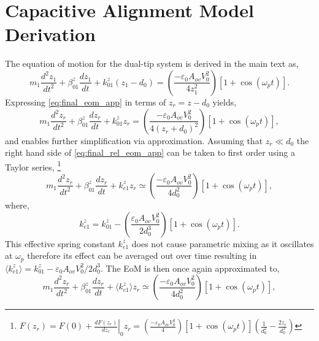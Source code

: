 \documentclass[12pt, a4paper, oneside]{book}
\begin{document}
\section{Capacitive Alignment Model Derivation}

The equation of motion for the dual-tip system is derived in the main text as,
\begin{equation}
	m_1 \frac{d^2z_1}{dt^2} + \beta_{01}^z \frac{dz_1}{dt} + k_{01}^z (z_1-d_0) = \left( \frac{-\varepsilon_0 A_{ov} V_0^2}{4z_1^2}\right)\left[1+\cos(\omega_pt)\right].
\label{eq:final_eom_app}
\end{equation}
Expressing \eqref{eq:final_eom_app} in terms of $z_r = z - d_0$ yields,
\begin{equation}
	m_1 \frac{d^2z_r}{dt^2} + \beta_{01}^z \frac{dz_r}{dt} + k_{01}^zz_r = \left( \frac{-\varepsilon_0 A_{ov} V_0^2}{4(z_r+d_0)^2}\right)\left[1+\cos(\omega_pt)\right],
\label{eq:final_rel_eom_app}
\end{equation}
and enables further simplification via approximation. Assuming that $z_r \ll d_0$ the right hand side of \eqref{eq:final_rel_eom_app} can be taken to first order using a Taylor series,%
\footnote{$F(z_r) = F(0) + \left.\frac{dF(z_r)}{dz_r}\right\rvert_0 z_r = \left(\frac{-\varepsilon_0 A_{ov} V_0^2}{4}\right) [1+\cos(\omega_pt)] \left(\frac{1}{d_0^2} - \frac{2z_r}{d_0^3 }\right)$}
%
\begin{equation}
m_1 \frac{d^2z_r}{dt^2} + \beta_{01}^z \frac{dz_r}{dt} + k_{e1}^zz_r \simeq \left(\frac{-\varepsilon_0 A_{ov} V_0^2}{4d_0^2}\right) \left[1+\cos(\omega_pt)\right],
\label{eq:first_order_eom_app}
\end{equation}
%
where,
%
\begin{equation}
k_{e1}^z = k_{01}^z - \left(\frac{\varepsilon_0 A_{ov} V_0^2}{2d_0^3}\right) \left[1+\cos(\omega_pt)\right].
\end{equation}
This effective spring constant $k_{e1}^z$ does not cause parametric mixing as it oscillates at $\omega_p$ therefore its effect can be averaged out over time resulting in $\langle k_{e1}^{z} \rangle = k_{01}^z - {\varepsilon_0 A_{ov} V_0^2}/{2d_0^3}$. The EoM is then once again approximated to,
\begin{equation}
m_1 \frac{d^2z_r}{dt^2} + \beta_{01}^z \frac{dz_r}{dt} + \langle k_{e1}^{z} \rangle z_r \simeq \left(\frac{-\varepsilon_0 A_{ov} V_0^2}{4d_0^2}\right) \left[1+\cos(\omega_pt)\right],
\end{equation}
\end{document}
